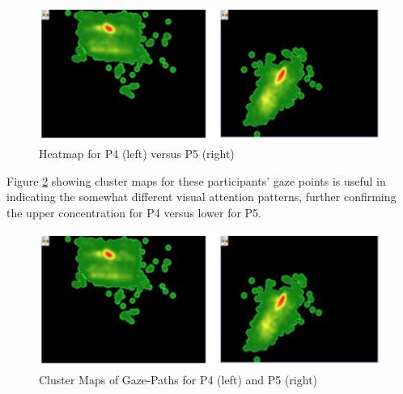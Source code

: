 \documentclass[output=paper]{langsci/langscibook}
\begin{document}
\begin{figure}
 \includegraphics[width=\textwidth]{figures/OHagan6.png}
\caption{Heatmap for P4 (left) versus P5 (right)}
\label{fig:6}
\end{figure}

Figure \ref{fig:7} showing cluster maps for these participants' gaze points is useful in indicating the somewhat different visual attention patterns, further confirming the upper concentration for P4 versus lower for P5.


  
\begin{figure}
 \includegraphics[width=\textwidth]{figures/OHagan6.png}
 \caption{Cluster Maps of Gaze-Paths for P4 (left) and P5 (right)}
\label{fig:7}
\end{figure}
\end{document}
